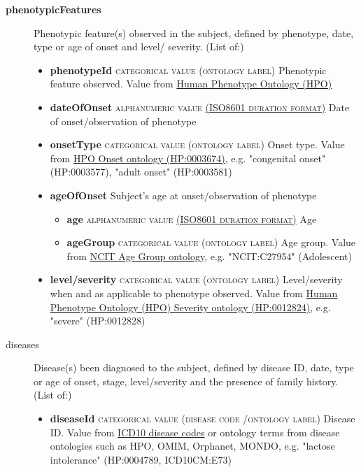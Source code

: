 \documentclass[a4paper, 10pt]{article}        %
\begin{document}
\begin{description}
	\item[\textbf{phenotypicFeatures}] Phenotypic feature(s) observed in the subject, defined by phenotype, date, type or age of onset and level/ severity. (List of:)
	\begin{itemize}
			\item[] \textbf{phenotypeId} {\textsc{categorical value (ontology label)}} Phenotypic feature observed. Value from \href{http:purl.obolibrary.org/obo/HP_0000001}{Human Phenotype Ontology (HPO)} 
			\item[] \textbf{dateOfOnset} {\textsc{alphanumeric value \href{https://www.iso.org/iso-8601-date-and-time-format.html}{(ISO8601 duration format)}}} Date of onset/observation of phenotype   
			\item[] \textbf{onsetType} {\textsc{categorical value (ontology label)}}
 Onset type. Value from \href{http://purl.obolibrary.org/obo/HP_0003674}{HPO Onset ontology (HP:0003674)}, e.g. "congenital onset" (HP:0003577), "adult onset" (HP:0003581)
  			\item[] \textbf{ageOfOnset} Subject's age at onset/observation of phenotype
			\begin{itemize}
 			\item[] \textbf{age} {\textsc{alphanumeric value \href{https://www.iso.org/iso-8601-date-and-time-format.html}{(ISO8601 duration format)}}} Age  
			\item[] \textbf{ageGroup} {\textsc{categorical value (ontology label)}} Age group. Value from \href{https://www.ebi.ac.uk/ols/ontologies/ncit/terms?iri=http%3A%2F%2Fpurl.obolibrary.org%2Fobo%2FNCIT_C20587}{NCIT Age Group ontology}, e.g. "NCIT:C27954" (Adolescent)
			\end{itemize}
			\item[] \textbf{level/severity}  {\textsc{categorical value (ontology label)}} Level/severity when and as applicable to phenotype observed. Value from \href{http://purl.obolibrary.org/obo/HP_0012824}{Human Phenotype Ontology (HPO) Severity ontology (HP:0012824)}, e.g. "severe" (HP:0012828)
	\end{itemize}
	\item[diseases] Disease(s) been diagnosed to the subject, defined by disease ID, date, type or age of onset, stage, level/severity and the presence of family history. (List of:)
	\begin{itemize}
			\item[]  \textbf{diseaseId} {\textsc{categorical value (disease code /ontology label)}} Disease ID. Value from \href{https://www.who.int/classifications/icd/en/}{ICD10 disease codes} or ontology terms from disease ontologies such as HPO, OMIM, Orphanet, MONDO, e.g. "lactose intolerance" (HP:0004789, ICD10CM:E73)

\end{itemize}
\end{description}
\end{document}
